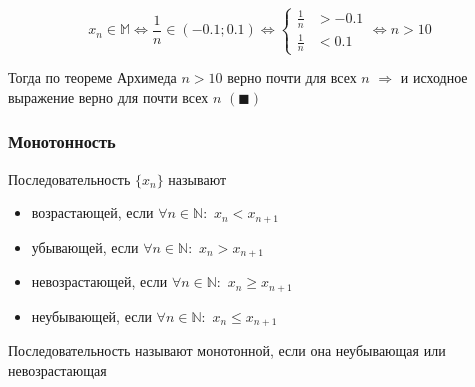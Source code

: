 \documentclass[class=article,a4paper,12pt,crop=false]{standalone}
\begin{document}
\begin{equation}
  x_n \in \mathbb{M} \Leftrightarrow \frac{1}{n} \in (-0.1; 0.1) \Leftrightarrow
  \begin{cases}
    \frac{1}{n} &> -0.1 \\
    \frac{1}{n} &< 0.1
  \end{cases}
  \Leftrightarrow n > 10
\end{equation}

Тогда по теореме Архимеда $n > 10$ верно почти для всех $n$ $\Rightarrow$ и исходное
выражение верно для почти всех $n$ $(\blacksquare)$

\subsubsection{Монотонность}

Последовательность $\{x_n\}$ называют
\begin{itemize}
  \item {
    возрастающей, если $\forall n \in \mathbb{N}:$ $x_n < x_{n + 1}$ 
  }
  \item {
    убывающей, если $\forall n \in \mathbb{N}:$ $x_n > x_{n + 1}$ 
  }
  \item {
    невозрастающей, если $\forall n \in \mathbb{N}:$ $x_n \geq x_{n + 1}$ 
  }
  \item {
    неубывающей, если $\forall n \in \mathbb{N}:$ $x_n \leq x_{n + 1}$ 
  }
\end{itemize}

Последовательность называют монотонной, если она неубывающая или невозрастающая
\end{document}
